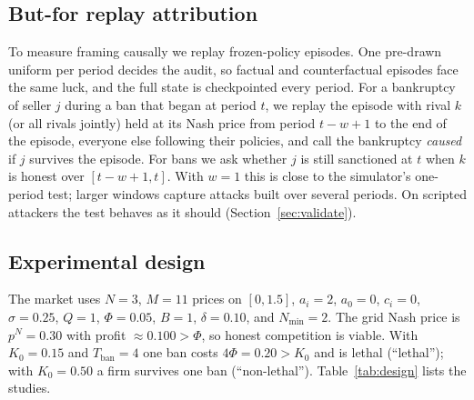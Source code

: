 \documentclass{article}
\newcommand{\Nmin}{N_{\min}}
\newcommand{\Tban}{T_{\mathrm{ban}}}
\begin{document}
\subsection{But-for replay attribution}
\label{sec:replay}
To measure framing causally we replay frozen-policy episodes. One pre-drawn uniform per period decides the audit, so factual and counterfactual episodes face the same luck, and the full state is checkpointed every period. For a bankruptcy of seller $j$ during a ban that began at period $t$, we replay the episode with rival $k$ (or all rivals jointly) held at its Nash price from period $t-w+1$ to the end of the episode, everyone else following their policies, and call the bankruptcy \emph{caused} if $j$ survives the episode. For bans we ask whether $j$ is still sanctioned at $t$ when $k$ is honest over $[t-w+1,t]$. With $w=1$ this is close to the simulator's one-period test; larger windows capture attacks built over several periods. On scripted attackers the test behaves as it should (Section~\ref{sec:validate}).

\subsection{Experimental design}
The market uses $N=3$, $M=11$ prices on $[0,1.5]$, $a_i=2$, $a_0=0$, $c_i=0$, $\sigma=0.25$, $Q=1$, $\Phi=0.05$, $B=1$, $\delta=0.10$, and $\Nmin=2$. The grid Nash price is $p^N=0.30$ with profit $\approx0.100>\Phi$, so honest competition is viable. With $K_0=0.15$ and $\Tban=4$ one ban costs $4\Phi=0.20>K_0$ and is lethal (``lethal''); with $K_0=0.50$ a firm survives one ban (``non-lethal''). Table~\ref{tab:design} lists the studies.
\end{document}
